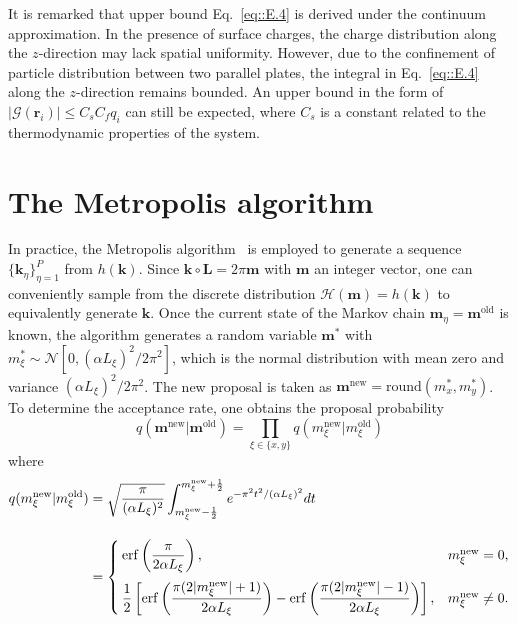 It is remarked that upper bound Eq.~\eqref{eq::E.4} is derived under the continuum approximation. In the presence of surface charges, the charge distribution along the $z$-direction may lack spatial uniformity. However, due to the confinement of particle distribution between two parallel plates, the integral in Eq.~\eqref{eq::E.4} along the $z$-direction remains bounded. An upper bound in the form of $|\mathscr{G}(\bm{r}_i)|\leq C_s C_{f}q_i$ can still be expected, where $C_s$ is a constant related to the thermodynamic properties of the system.

\section{The Metropolis algorithm} \label{app::Metropolis}

In practice, the Metropolis algorithm~\cite{metropolis1953equation, hastings1970monte} is employed to generate a sequence $\{\bm{k}_{\eta}\}_{\eta=1}^{P}$ from $h(\bm{k})$. 
Since $\bm{k}\circ \bm{L}=2\pi \bm{m}$ with $\bm{m}$ an integer vector, one can conveniently sample from the discrete distribution $\mathcal{H}(\bm{m})=h(\bm{k})$ to equivalently generate $\bm{k}$. 
Once the current state of the Markov chain $\bm{m}_{\eta}=\bm{m}^{\text{old}}$ is known, the algorithm generates a random variable $\bm{m}^*$ with $m_{\xi}^*\sim \mathcal{N}[0,(\alpha L_{\xi})^2/2\pi^2]$, which is the normal distribution with mean zero and variance $(\alpha L_{\xi})^2/2\pi^2$. The new proposal is taken as $\bm{m}^{\text{new}}=\text{round}(m_{x}^*,m_{y}^*)$. To determine the acceptance rate, one obtains the proposal probability 
\begin{equation}
	q(\bm{m}^{\text{new}}|\bm{m}^{\text{old}})=\prod_{\xi\in\{x,y\}}q(m^{\text{new}}_{\xi}|m^{\text{old}}_{\xi})
\end{equation}
where
\begin{equation}
	\begin{split}
		q(m^{\text{new}}_{\xi}|m^{\text{old}}_{\xi})&=\sqrt{\frac{\pi}{(\alpha L_{\xi})^2}}\int_{m^{\text{new}}_{\xi}-\frac{1}{2}}^{m^{\text{new}}_{\xi}+\frac{1}{2}}e^{-\pi^2t^2/(\alpha L_{\xi})^2}dt\\[1em]
		&=\begin{cases}
			\operatorname{erf}\left(\dfrac{\pi}{2\alpha L_{\xi}}\right),&m_{\xi}^{\text{new}}=0,\\[1.15em]
			\dfrac{1}{2}\left[\operatorname{erf}\left(\dfrac{\pi(2|m_{\xi}^{\text{new}}|+1)}{2\alpha L_{\xi}}\right)-\operatorname{erf}\left(\dfrac{\pi(2|m_{\xi}^{\text{new}}|-1)}{2\alpha L_{\xi}}\right)\right],&m_{\xi}^{\text{new}}\neq 0.
		\end{cases}
	\end{split}
\end{equation}
